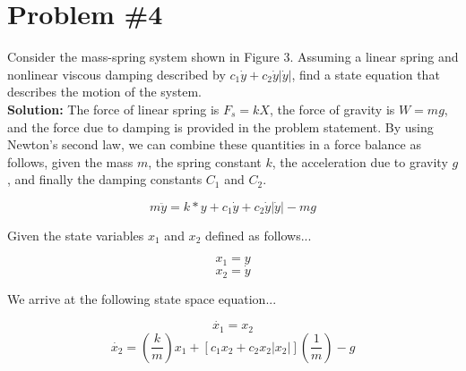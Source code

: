 \section*{Problem \#4}

Consider the mass-spring system shown in Figure 3. Assuming a linear spring and nonlinear viscous damping described by $ c_{1}\dot{y} + c_{2}\dot{y}|\dot{y}|$, find a state equation that describes the motion of the system. \\



\textbf{Solution:} The force of linear spring is $F_{s} = kX$, the force of gravity is $ W=mg$, and the force due to damping is provided in the problem statement. By using Newton's second law, we can combine these quantities in a force balance as follows, given the mass $m$, the spring constant $k$, the acceleration due to gravity $g$, and finally the damping constants $C_{1}$ and $ C_{2}$.

$$ m\ddot{y} = k*y + c_{1}\dot{y} + c_{2}\dot{y}|\dot{y}| -mg $$

Given the state variables $x_{1}$ and $ x_{2}$ defined as follows...

\[ x_{1} = y \]
\[ x_{2} = \dot{y} \]

We arrive at the following state space equation...

\[ \dot{x_{1}} = x_{2}\]
\[ \dot{x_{2}} = \left( \frac{k}{m} \right)x_{1}  + \left[ c_{1}x_{2} + c_{2}x_{2}|x_{2}| \right]  \left( \frac{1}{m} \right) -g \]
